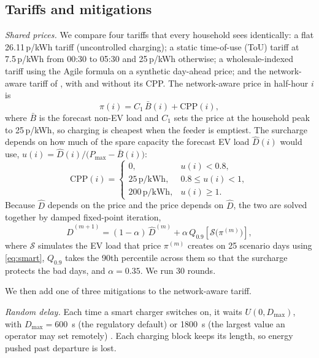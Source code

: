 \documentclass[conference]{IEEEtran}
\newcommand{\pkwh}{\,p/kWh}
\begin{document}
\subsection{Tariffs and mitigations}

\emph{Shared prices.} We compare four tariffs that every household sees
identically: a flat 26.11\pkwh{} tariff (uncontrolled charging); a static
time-of-use (ToU) tariff at 7.5\pkwh{} from 00:30 to 05:30 and 25\pkwh{}
otherwise; a wholesale-indexed tariff using the Agile formula \cite{octopus}
on a synthetic day-ahead price; and the network-aware tariff of
\cite{gupta2027}, with and without its CPP. The network-aware price in
half-hour $i$ is
\begin{equation}
\pi(i) = C_1\,\bar{B}(i) + \mathrm{CPP}(i),
\label{eq:network}
\end{equation}
where $\bar{B}$ is the forecast non-EV load and $C_1$ sets the price at the
household peak to 25\pkwh, so charging is cheapest when the feeder is
emptiest. The surcharge depends on how much of the spare capacity the
forecast EV load $\hat{D}(i)$ would use,
$u(i) = \hat{D}(i)/\big(P_{\max} - \bar{B}(i)\big)$:
\begin{equation}
\mathrm{CPP}(i) =
\begin{cases}
0, & u(i) < 0.8,\\
25\,\text{p/kWh}, & 0.8 \le u(i) < 1,\\
200\,\text{p/kWh}, & u(i) \ge 1.
\end{cases}
\label{eq:cpp}
\end{equation}
Because $\hat{D}$ depends on the price and the price depends on $\hat{D}$,
the two are solved together by damped fixed-point iteration,
\begin{equation}
\hat{D}^{(m+1)} = (1-\alpha)\,\hat{D}^{(m)} + \alpha\,
Q_{0.9}\!\left[\mathcal{S}\big(\pi^{(m)}\big)\right],
\label{eq:fp}
\end{equation}
where $\mathcal{S}$ simulates the EV load that price $\pi^{(m)}$ creates on
25 scenario days using \eqref{eq:smart}, $Q_{0.9}$ takes the 90th percentile
across them so that the surcharge protects the bad days, and $\alpha = 0.35$.
We run 30 rounds.

We then add one of three mitigations to the network-aware tariff.

\emph{Random delay.} Each time a smart charger switches on, it waits
$U(0, D_{\max})$, with $D_{\max} = 600$~s (the regulatory default) or 1800~s
(the largest value an operator may set remotely) \cite{scpregs}. Each
charging block keeps its length, so energy pushed past departure is lost.
\end{document}
